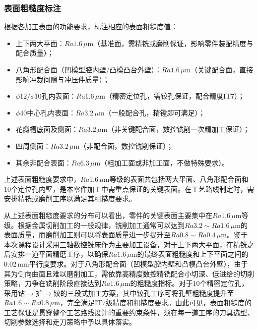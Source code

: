 \documentclass{xautCADreport}
\begin{document}
\subsubsection{表面粗糙度标注}

根据各加工表面的功能要求，标注相应的表面粗糙度值：
\begin{itemize}
  \item 上下两大平面：$Ra1.6\,\mu\mathrm{m}$（基准面，需精铣或磨削保证，影响零件装配精度与配合质量）；
  \item 八角形配合面（凹模型腔内壁/凸模凸台外壁）：$Ra1.6\,\mu\mathrm{m}$（关键配合面，直接影响冲裁间隙与冲压件质量）；
  \item $\phi12/\phi10$孔内表面：$Ra1.6\,\mu\mathrm{m}$（精密定位孔，需铰孔保证，配合精度IT7）；
  \item $\phi40$中心孔内表面：$Ra3.2\,\mu\mathrm{m}$（一般配合孔，精镗即可满足）；
  \item 花瓣槽底面及侧面：$Ra3.2\,\mu\mathrm{m}$（非关键配合面，数控铣削一次精加工保证）；
  \item 四周侧面：$Ra3.2\,\mu\mathrm{m}$（非配合面，数控铣削保证）；
  \item 其余非配合表面：$Ra6.3\,\mu\mathrm{m}$（粗加工面或非加工面，不做特殊要求）。
\end{itemize}

上述表面粗糙度要求中，$Ra1.6\,\mu\mathrm{m}$等级的表面共包括两大平面、八角形配合面和10个定位孔内壁，是本零件加工中需重点保证的关键表面。在工艺路线制定时，需安排精铣或磨削工序以满足其粗糙度要求。

从上述表面粗糙度要求的分布可以看出，零件的关键表面主要集中在$Ra1.6\,\mu\mathrm{m}$等级。根据金属切削加工的一般规律，铣削加工通常可以达到$Ra3.2\sim Ra1.6\,\mu\mathrm{m}$的表面质量，而磨削加工则可以将表面质量进一步提升至$Ra0.8\sim Ra0.4\,\mu\mathrm{m}$。鉴于本次课程设计采用三轴数控铣床作为主要加工设备，对于上下两大平面，在精铣之后安排一道平面精磨工序，以确保$Ra1.6\,\mu\mathrm{m}$的最终表面粗糙度和上下平面之间的$0.02\,\mathrm{mm}$平行度要求。对于八角形配合面（凹模型腔内壁和凸模凸台外壁），由于其为侧向曲面且难以磨削加工，需依靠高精度数控精铣配合小切深、低进给的切削策略，力争在铣削阶段直接达到$Ra1.6\,\mu\mathrm{m}$的粗糙度指标。对于10个精密定位孔，采用钻$\to$扩$\to$铰的三段式加工方案，其中铰孔工序可将孔壁粗糙度提升至$Ra1.6\sim Ra0.8\,\mu\mathrm{m}$，完全满足IT7级精度和粗糙度要求。由此可见，表面粗糙度的工艺保证是贯穿整个工艺路线设计的重要约束条件，须在每一道工序的刀具选型、切削参数选择和走刀策略中予以具体落实。
\end{document}
